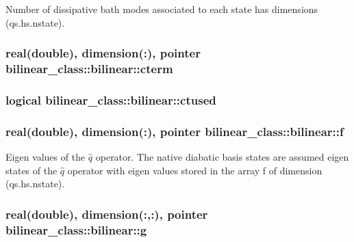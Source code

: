 Number of dissipative bath modes associated to each state has dimensions (qs.\+hs.\+nstate). 

\hypertarget{structbilinear__class_1_1bilinear_a2ef21bf96002e18fe9aa3c9edfcca3ed}{
\subsubsection[{cterm}]{\setlength{\rightskip}{0pt plus 5cm}real(double), dimension(\+:), pointer bilinear\+\_\+class\+::bilinear\+::cterm\hspace{0.3cm}{\ttfamily [private]}}}\label{structbilinear__class_1_1bilinear_a2ef21bf96002e18fe9aa3c9edfcca3ed}
\hypertarget{structbilinear__class_1_1bilinear_aba7556e23595f003ffcf20327dc18f3e}{
\subsubsection[{ctused}]{\setlength{\rightskip}{0pt plus 5cm}logical bilinear\+\_\+class\+::bilinear\+::ctused\hspace{0.3cm}{\ttfamily [private]}}}\label{structbilinear__class_1_1bilinear_aba7556e23595f003ffcf20327dc18f3e}
\hypertarget{structbilinear__class_1_1bilinear_a809699845e36e344b7aeb51642c333ec}{
\subsubsection[{f}]{\setlength{\rightskip}{0pt plus 5cm}real(double), dimension(\+:), pointer bilinear\+\_\+class\+::bilinear\+::f\hspace{0.3cm}{\ttfamily [private]}}}\label{structbilinear__class_1_1bilinear_a809699845e36e344b7aeb51642c333ec}


Eigen values of the $ \hat q $ operator. The native diabatic basis states are assumed eigen states of the $ \hat q $ operator with eigen values stored in the array f of dimension (qs.\+hs.\+nstate). 

\hypertarget{structbilinear__class_1_1bilinear_a910401429e7649dba49acbab872a1b75}{
\subsubsection[{g}]{\setlength{\rightskip}{0pt plus 5cm}real(double), dimension(\+:,\+:), pointer bilinear\+\_\+class\+::bilinear\+::g\hspace{0.3cm}{\ttfamily [private]}}}\label{structbilinear__class_1_1bilinear_a910401429e7649dba49acbab872a1b75}


